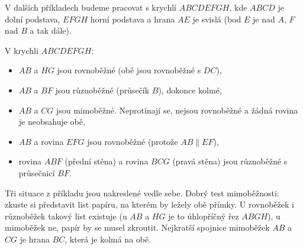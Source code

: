 V dalších příkladech budeme pracovat s krychlí $ABCDEFGH$, kde $ABCD$ je dolní podstava, $EFGH$ horní podstava a hrana $AE$ je svislá (bod $E$ je nad $A$, $F$ nad $B$ a tak dále).

\begin{center}
\end{center}

\begin{example}
  V krychli $ABCDEFGH$:
  \begin{itemize}
    \item $AB$ a $HG$ jsou rovnoběžné (obě jsou rovnoběžné s $DC$),
    \item $AB$ a $BF$ jsou různoběžné (průsečík $B$), dokonce kolmé,
    \item $AB$ a $CG$ jsou mimoběžné. Neprotínají se, nejsou rovnoběžné a žádná rovina je neobsahuje obě,
    \item $AB$ a rovina $EFG$ jsou rovnoběžné (protože $AB\parallel EF$),
    \item rovina $ABF$ (přední stěna) a rovina $BCG$ (pravá stěna) jsou různoběžné s průsečnicí $BF$.
  \end{itemize}
\end{example}

Tři situace z příkladu jsou nakreslené vedle sebe. Dobrý test mimoběžnosti: zkuste si představit list papíru, na kterém by ležely obě přímky. U rovnoběžek i různoběžek takový list existuje (u $AB$ a $HG$ je to úhlopříčný řez $ABGH$), u mimoběžek ne, papír by se musel zkroutit. Nejkratší spojnice mimoběžek $AB$ a $CG$ je hrana $BC$, která je kolmá na obě.


